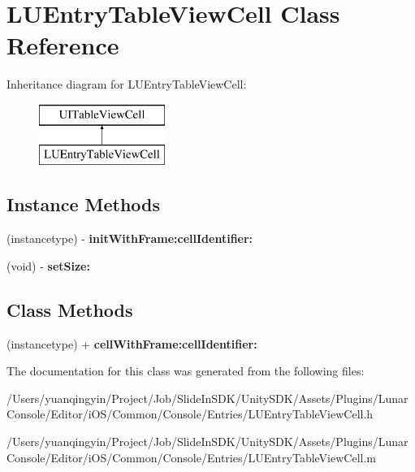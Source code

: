 \hypertarget{interface_l_u_entry_table_view_cell}{}\section{L\+U\+Entry\+Table\+View\+Cell Class Reference}
\label{interface_l_u_entry_table_view_cell}
Inheritance diagram for L\+U\+Entry\+Table\+View\+Cell\+:\begin{figure}[H]
\begin{center}
\leavevmode
\includegraphics[height=2.000000cm]{interface_l_u_entry_table_view_cell}
\end{center}
\end{figure}
\subsection*{Instance Methods}
\begin{DoxyCompactItemize}
\item 
\mbox{\label{interface_l_u_entry_table_view_cell_a6c26aa8733f1500f4f62b753103460e6}} 
(instancetype) -\/ {\bfseries init\+With\+Frame\+:cell\+Identifier\+:}
\item 
\mbox{\label{interface_l_u_entry_table_view_cell_ac0290fabfcd2bbbbab8b8b118c9cf7d9}} 
(void) -\/ {\bfseries set\+Size\+:}
\end{DoxyCompactItemize}
\subsection*{Class Methods}
\begin{DoxyCompactItemize}
\item 
\mbox{\label{interface_l_u_entry_table_view_cell_a9cb3dfaa1af8843bcac7e3b6a88ee5b6}} 
(instancetype) + {\bfseries cell\+With\+Frame\+:cell\+Identifier\+:}
\end{DoxyCompactItemize}


The documentation for this class was generated from the following files\+:\begin{DoxyCompactItemize}
\item 
/\+Users/yuanqingyin/\+Project/\+Job/\+Slide\+In\+S\+D\+K/\+Unity\+S\+D\+K/\+Assets/\+Plugins/\+Lunar\+Console/\+Editor/i\+O\+S/\+Common/\+Console/\+Entries/L\+U\+Entry\+Table\+View\+Cell.\+h\item 
/\+Users/yuanqingyin/\+Project/\+Job/\+Slide\+In\+S\+D\+K/\+Unity\+S\+D\+K/\+Assets/\+Plugins/\+Lunar\+Console/\+Editor/i\+O\+S/\+Common/\+Console/\+Entries/L\+U\+Entry\+Table\+View\+Cell.\+m\end{DoxyCompactItemize}
